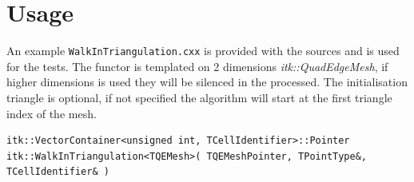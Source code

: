 \documentclass{InsightArticle}
\begin{document}
\section{Usage}

An example \texttt{WalkInTriangulation.cxx} is provided with the sources and is used for the tests. The functor is templated on 2 dimensions \textit{itk::QuadEdgeMesh}, if higher dimensions is used they will be silenced in the processed. The initialisation triangle is optional, if not specified the algorithm will start at the first triangle index of the mesh.
\begin{verbatim}
itk::VectorContainer<unsigned int, TCellIdentifier>::Pointer
itk::WalkInTriangulation<TQEMesh>( TQEMeshPointer, TPointType&, TCellIdentifier& )
\end{verbatim}


%
%



\end{document}

